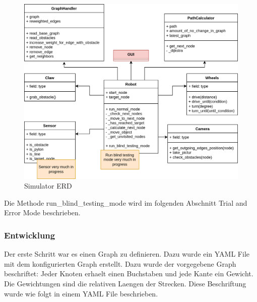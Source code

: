 \begin{figure}[H]
\centering
\includegraphics[width=\textwidth]{assets/informatik-prototyp/simulator/simulator-erd.png}
\caption{Simulator ERD}
\label{fig:simulator-erd}
\end{figure}

Die Methode run\_blind\_testing\_mode wird im folgenden Abschnitt Trial and Error Mode beschrieben. 

\subsubsection{Entwicklung}

Der erste Schritt war es einen Graph zu definieren. Dazu wurde ein YAML File mit dem konfigurierten Graph erstellt. 
Dazu wurde der vorgegebene Graph beschriftet: Jeder Knoten erhaelt einen Buchstaben und jede Kante ein Gewicht. Die Gewichtungen sind die relativen Laengen der Strecken. Diese Beschriftung wurde wie folgt in einem YAML File beschrieben.

